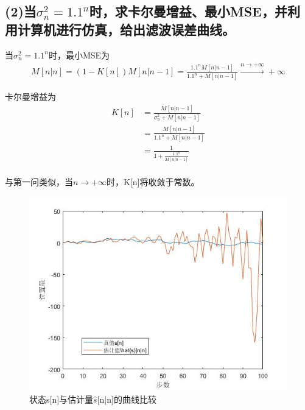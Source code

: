 \documentclass[fontset=windows]{article}
\numberwithin{figure}{section}
\begin{document}
\subsection*{(2)当\(\sigma_n^2=1.1^n\)时，求卡尔曼增益、最小MSE，并利用计算机进行仿真，给出滤波误差曲线。}

当\(\sigma_n^2=1.1^n\)时，最小MSE为
\begin{align*}
    M[n|n]=(1-K[n])M[n|n-1]=\frac{1.1^nM[n|n-1]}{1.1^n+M[n|n-1]}
    \overset{n\to +\infty}{\to} +\infty
\end{align*}

卡尔曼增益为
\begin{align*}
    K[n] & =\frac{M[n|n-1]}{\sigma_n^2+M[n|n-1]} \\
         & =\frac{M[n|n-1]}{1.1^n+M[n|n-1]}      \\
         & = \frac{1}{1+\frac{1.1^n}{M[n|n-1]}}  \\
\end{align*}

与第一问类似，当\(n\to +\infty\)时，K[n]将收敛于常数。

\begin{figure}[H]
    \centering
    \includegraphics[scale=0.5]{2_3.jpg}
    \caption{状态s[n]与估计量\(\hat{s}\)[n|n]的曲线比较}
    \label{2.3}
\end{figure}
\end{document}
